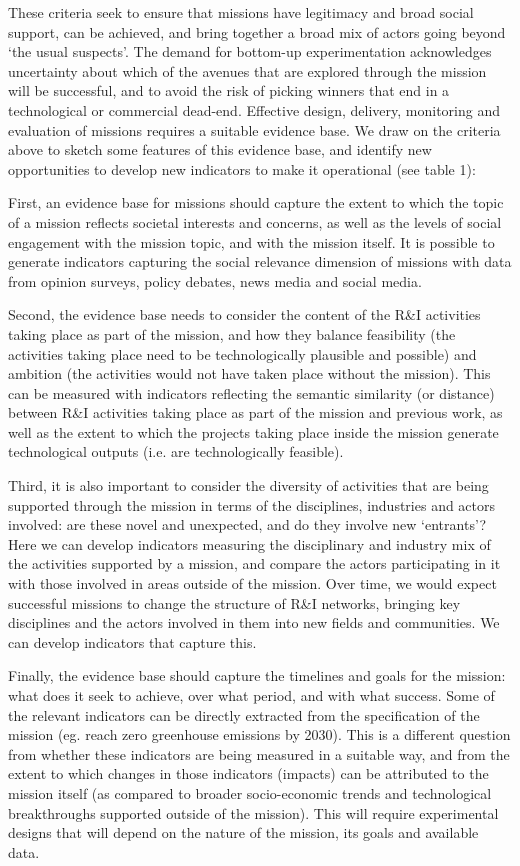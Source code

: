 \documentclass[11pt]{article}
\begin{document}
These criteria seek to ensure that missions have legitimacy and broad social support, can be achieved, and bring together a broad mix of actors going beyond `the usual suspects'. The demand for bottom-up experimentation acknowledges uncertainty about which of the avenues that are explored through the mission will be successful, and to avoid the risk of picking winners that end in a technological or commercial dead-end. Effective design, delivery, monitoring and evaluation of missions requires a suitable evidence base. We draw on the criteria above to sketch some features of this evidence base, and identify new opportunities to develop new indicators to make it operational (see table 1):

First, an evidence base for missions should capture the extent to which the topic of a mission reflects societal interests and concerns, as well as the levels of social engagement with the mission topic, and with the mission itself. It is possible to generate indicators capturing the social relevance dimension of missions with data from opinion surveys, policy debates, news media and social media. 

Second, the evidence base needs to consider the content of the R\&I activities taking place as part of the mission, and how they balance feasibility (the activities taking place need to be technologically plausible and possible) and ambition (the activities would not have taken place without the mission). This can be measured with indicators reflecting the semantic similarity (or distance) between R&I activities taking place as part of the mission and previous work, as well as the extent to which the projects taking place inside the mission
generate technological outputs (i.e. are technologically feasible).

Third, it is also important to consider the diversity of activities that are being supported through the mission in terms of the disciplines, industries and actors involved: are these novel and unexpected, and do they involve new `entrants’? Here we can develop indicators measuring the disciplinary and industry mix of the activities supported by a mission, and compare the actors participating in it with those involved in areas outside of the mission. Over time, we would expect successful missions to change the structure of R&I networks, bringing key disciplines and the actors involved in them into new fields and communities. We can develop indicators that capture this.

Finally, the evidence base should capture the time\-lines and goals for the mission: what does it seek to achieve, over what period, and with what success. Some of the relevant indicators can be directly extracted from the specification of the mission (eg. reach zero greenhouse emissions by 2030). This is a different question from whether these indicators are being measured in a suitable way, and from the extent to which changes in those indicators (impacts) can be attributed to the mission itself (as compared to broader socio-economic trends and technological breakthroughs supported outside of the mission). This will require experimental designs that will depend on the nature of the mission, its goals and available data.
\end{document}
